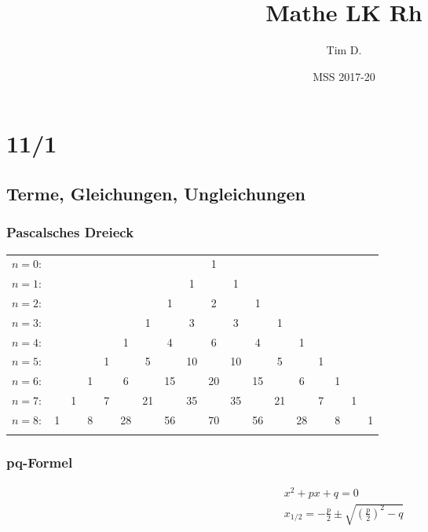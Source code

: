 



\title{Mathe LK Rh}
\author{Tim D.}
\date{MSS 2017-20}
\maketitle

\tableofcontents
\newpage

\part{11/1}

\chapter{Terme, Gleichungen, Ungleichungen}
\section{Pascalsches Dreieck}
\begin{tabular}{rccccccccccccccccc}
  $n=0\colon$&    &    &    &    &    &    &    &    &  1\\\noalign{\smallskip\smallskip}
  $n=1\colon$&    &    &    &    &    &    &    &  1 &    &  1\\\noalign{\smallskip\smallskip}
  $n=2\colon$&    &    &    &    &    &    &  1 &    &  2 &    &  1\\\noalign{\smallskip\smallskip}
  $n=3\colon$&    &    &    &    &    &  1 &    &  3 &    &  3 &    &  1\\\noalign{\smallskip\smallskip}
  $n=4\colon$&    &    &    &    &  1 &    &  4 &    &  6 &    &  4 &    &  1\\\noalign{\smallskip\smallskip}
  $n=5\colon$&    &    &    &  1 &    &  5 &    & 10 &    & 10 &    &  5 &    &  1\\\noalign{\smallskip\smallskip}
  $n=6\colon$&    &    &  1 &    &  6 &    & 15 &    & 20 &    & 15 &    &  6 &    &  1\\\noalign{\smallskip\smallskip}
  $n=7\colon$&    &  1 &    &  7 &    & 21 &    & 35 &    & 35 &    & 21 &    &  7 &    &  1\\\noalign{\smallskip\smallskip}
  $n=8\colon$&  1 &    &  8 &    & 28 &    & 56 &    & 70 &    & 56 &    & 28 &    &  8 &    &  1\\\noalign{\smallskip\smallskip}
\end{tabular}
\section{pq-Formel}
\begin{gather*}
  x^2 + px + q = 0 \\
  x_{1/2} = -\frac{p}{2} \pm \sqrt{(\frac{p}{2})^2 - q}
\end{gather*}
